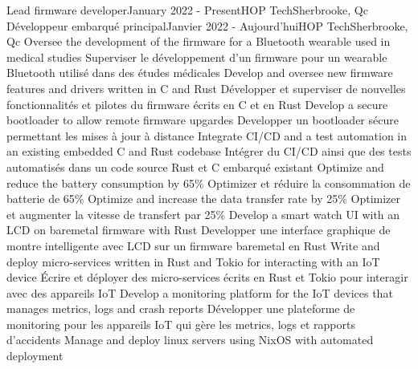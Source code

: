   \resumeSubHeadingListStart
      \resumeSubheadingEnFr
        {Lead firmware developer}{January 2022 - Present}{HOP Tech}{Sherbrooke, Qc}
        {Développeur embarqué principal}{Janvier 2022 - Aujourd'hui}{HOP Tech}{Sherbrooke, Qc}
            \resumeItemListStart
                \resumeItemEnFr
                    {Oversee the development of the firmware for a Bluetooth wearable used in medical studies}
                    {Superviser le développement d'un firmware pour un wearable Bluetooth utilisé dans des études médicales}
                \resumeItemEnFr
                    {Develop and oversee new firmware features and drivers written in C and Rust}
                    {Développer et superviser de nouvelles fonctionnalités et pilotes du firmware écrits en C et en Rust}
                \resumeItemEnFr
                    {Develop a secure bootloader to allow remote firmware upgardes}
                    {Developper un bootloader sécure permettant les mises à jour à distance}
                \resumeItemEnFr
                    {Integrate CI/CD and a test automation in an existing embedded C and Rust codebase}
                    {Intégrer du CI/CD ainsi que des tests automatisés dans un code source Rust et C embarqué existant}
                \resumeItemEnFr
                    {Optimize and reduce the battery consumption by 65\%}
                    {Optimizer et réduire la consommation de batterie de 65\%}
                \resumeItemEnFr
                    {Optimize and increase the data transfer rate by 25\%}
                    {Optimizer et augmenter la vitesse de transfert par 25\%}  
                \resumeItemEnFr
                    {Develop a smart watch UI with an LCD on baremetal firmware with Rust}
                    {Developper une interface graphique de montre intelligente avec LCD sur un firmware baremetal en Rust}
                \resumeItemEnFr
                    {Write and deploy micro-services written in Rust and Tokio for interacting with an IoT device}
                    {Écrire et déployer des micro-services écrits en Rust et Tokio pour interagir avec des appareils IoT}
                \resumeItemEnFr
                    {Develop a monitoring platform for the IoT devices that manages metrics, logs and crash reports}
                    {Développer une plateforme de monitoring pour les appareils IoT qui gère les metrics, logs et rapports d'accidents}
                \resumeItemEnFr
                    {Manage and deploy linux servers using NixOS with automated deployment}
